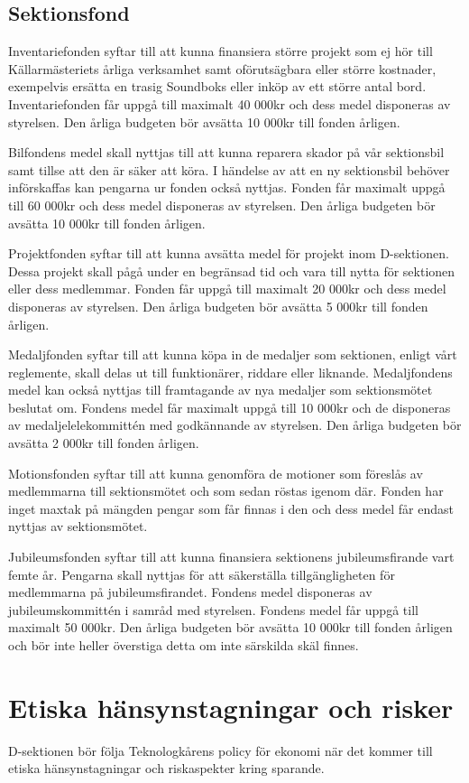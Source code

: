 \documentclass{dsekprotokoll}
\begin{document}
\subsection{Sektionsfond}
Inventariefonden syftar till att kunna finansiera större projekt som ej hör till Källarmästeriets årliga verksamhet samt oförutsägbara eller större kostnader, exempelvis ersätta en trasig Soundboks eller inköp av ett större antal bord. Inventariefonden får uppgå till maximalt 40 000kr och dess medel disponeras av styrelsen. Den årliga budgeten bör avsätta 10 000kr till fonden årligen.

Bilfondens medel skall nyttjas till att kunna reparera skador på vår sektionsbil samt tillse att den är säker att köra. I händelse av att en ny sektionsbil behöver införskaffas kan pengarna ur fonden också nyttjas. Fonden får maximalt uppgå till 60 000kr och dess medel disponeras av styrelsen. Den årliga budgeten bör avsätta 10 000kr till fonden årligen.

Projektfonden syftar till att kunna avsätta medel för projekt inom D-sektionen. Dessa projekt skall pågå under en begränsad tid och vara till nytta för sektionen eller dess medlemmar. Fonden får uppgå till maximalt 20 000kr och dess medel disponeras av styrelsen. Den årliga budgeten bör avsätta 5 000kr till fonden årligen.

Medaljfonden syftar till att kunna köpa in de medaljer som sektionen, enligt vårt reglemente, skall delas ut till funktionärer, riddare eller liknande. Medaljfondens medel kan också nyttjas till framtagande av nya medaljer som sektionsmötet beslutat om. Fondens medel får maximalt uppgå till 10 000kr och de disponeras av medaljelelekommittén med godkännande av styrelsen. Den årliga budgeten bör avsätta 2 000kr till fonden årligen.

Motionsfonden syftar till att kunna genomföra de motioner som föreslås av medlemmarna till sektionsmötet och som sedan röstas igenom där. Fonden har inget maxtak på mängden pengar som får finnas i den och dess medel får endast nyttjas av sektionsmötet.

Jubileumsfonden syftar till att kunna finansiera sektionens jubileumsfirande vart femte år. Pengarna skall nyttjas för att säkerställa tillgängligheten för medlemmarna på jubileumsfirandet. Fondens medel disponeras av jubileumskommittén i samråd med styrelsen. Fondens medel får uppgå till maximalt 50 000kr. Den årliga budgeten bör avsätta 10 000kr till fonden årligen och bör inte heller överstiga detta om inte särskilda skäl finnes.

\section{Etiska hänsynstagningar och risker}

D-sektionen bör följa Teknologkårens policy för ekonomi när det kommer till etiska hänsynstagningar och riskaspekter kring sparande.
\end{document}
